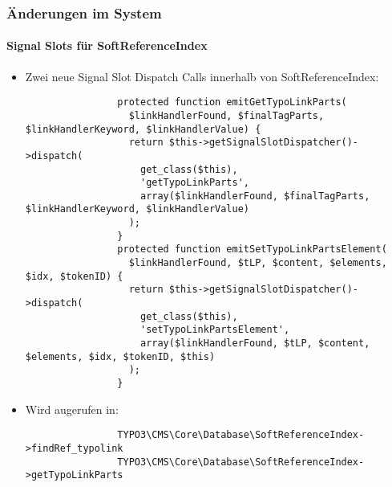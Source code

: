 \begin{frame}[fragile]
	\frametitle{Änderungen im System}
	\framesubtitle{Signal Slots für SoftReferenceIndex}
	\lstset{
		basicstyle=\tiny\ttfamily
	}
	\begin{itemize}
		\item Zwei neue Signal Slot Dispatch Calls innerhalb von SoftReferenceIndex:

			\begin{lstlisting}
				protected function emitGetTypoLinkParts(
				  $linkHandlerFound, $finalTagParts, $linkHandlerKeyword, $linkHandlerValue) {
				  return $this->getSignalSlotDispatcher()->dispatch(
				    get_class($this),
				    'getTypoLinkParts',
				    array($linkHandlerFound, $finalTagParts, $linkHandlerKeyword, $linkHandlerValue)
				  );
				}
				protected function emitSetTypoLinkPartsElement(
				  $linkHandlerFound, $tLP, $content, $elements, $idx, $tokenID) {
				  return $this->getSignalSlotDispatcher()->dispatch(
				    get_class($this),
				    'setTypoLinkPartsElement',
				    array($linkHandlerFound, $tLP, $content, $elements, $idx, $tokenID, $this)
				  );
				}
			\end{lstlisting}

		\item Wird augerufen in:

			\begin{lstlisting}
				TYPO3\CMS\Core\Database\SoftReferenceIndex->findRef_typolink
				TYPO3\CMS\Core\Database\SoftReferenceIndex->getTypoLinkParts
			\end{lstlisting}

	\end{itemize}

\end{frame}


